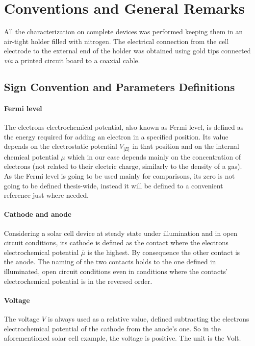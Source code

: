 

\section{Conventions and General Remarks}

	All the characterization on complete devices was performed keeping them in an air-tight holder filled with nitrogen.
	The electrical connection from the cell electrode to the external end of the holder was obtained using gold tips connected \textsl{via} a printed circuit board to a coaxial cable.

	\subsection{Sign Convention and Parameters Definitions}

		\paragraph{Fermi level} The electrons electrochemical potential, also known as Fermi level, is defined as the energy required for adding an electron in a specified position.
		Its value depends on the electrostatic potential $V_|E|$ in that position and on the internal chemical potential $\mu$ which in our case depends mainly on the concentration of electrons (not related to their electric charge, similarly to the density of a gas).
		As the Fermi level is going to be used mainly for comparisons, its zero is not going to be defined thesis-wide, instead it will be defined to a convenient reference just where needed.

		\paragraph{Cathode and anode} Considering a solar cell device at steady state under illumination and in open circuit conditions, its cathode is defined as the contact where the electrons electrochemical potential $\bar\mu$  is the highest.
		By consequence the other contact is the anode.
		The naming of the two contacts holds to the one defined in illuminated, open circuit conditions even in conditions where the contacts' electrochemical potential is in the reversed order.

		\paragraph{Voltage} The voltage $V$ is always used as a relative value, defined subtracting the electrons electrochemical potential of the cathode from the anode's one.
		So in the aforementioned solar cell example, the voltage is positive.
		The unit is the Volt.

